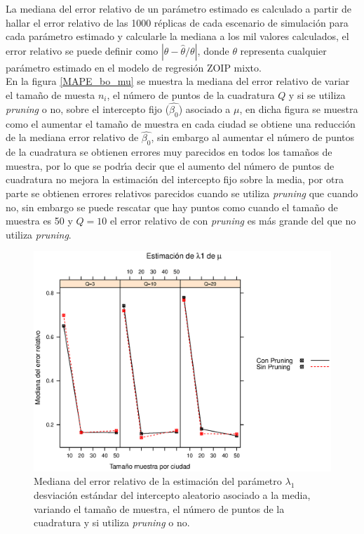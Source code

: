 La mediana del error relativo de un par\'{a}metro estimado es calculado a partir de hallar el error relativo de las 1000 r\'{e}plicas de cada escenario de simulaci\'{o}n para cada par\'{a}metro estimado y calcularle la mediana a los mil valores calculados, el error relativo se puede definir como $|\theta-\hat{\theta}/\theta|$, donde $\theta$ representa cualquier par\'{a}metro estimado en el modelo de regresi\'{o}n ZOIP mixto. \\

En la figura \ref{MAPE_bo_mu} se muestra la mediana del error relativo de variar el tama\~{n}o de muesta $n_i$, el n\'{u}mero de puntos de la cuadratura $Q$ y si se utiliza \textit{pruning} o no, sobre el intercepto fijo ($\hat{\beta_0}$) asociado a $\mu$, en dicha figura se muestra como el aumentar el tama\~{n}o de muestra en cada ciudad se obtiene una reducci\'{o}n de la mediana error relativo de $\hat{\beta_0}$, sin embargo al aumentar el n\'{u}mero de puntos de la cuadratura se obtienen errores muy parecidos en todos los tama\~{n}os de muestra, por lo que se podr\'{\i}a decir que el aumento del n\'{u}mero de puntos de cuadratura no mejora la estimaci\'{o}n del intercepto fijo sobre la media, por otra parte se obtienen errores relativos parecidos cuando se utiliza \textit{pruning} que cuando no, sin embargo se puede rescatar que hay puntos como cuando el tama\~{n}o de muestra es 50 y $Q=10$ el error relativo de con \textit{pruning} es m\'{a}s grande del que no utiliza \textit{pruning}.\\

\begin{figure}
	\begin{center}
		\includegraphics[scale=0.6]{MAPE_lambda1_mu.eps}	
		\caption{Mediana del error relativo de la estimaci\'{o}n del par\'{a}metro $\lambda_1$ desviaci\'{o}n est\'{a}ndar del intercepto aleatorio asociado a la media, variando el tama\~{n}o de muestra, el n\'{u}mero de puntos de la cuadratura y si utiliza \textit{pruning} o no.}
		\label{MAPE_lambda1_mu}
	\end{center}
\end{figure}

